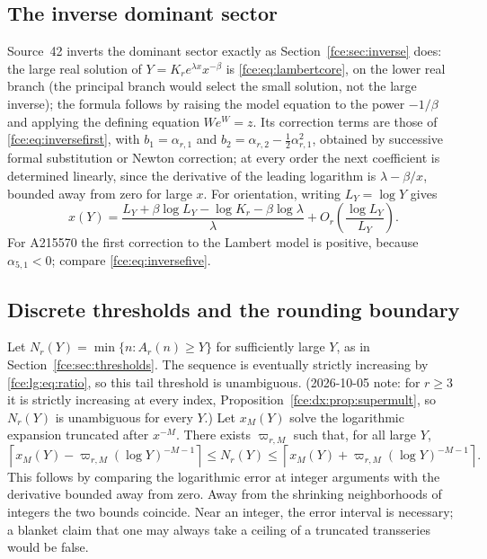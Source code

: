 \documentclass[11pt,a4paper]{article}
\numberwithin{equation}{section}
\theoremstyle{definition}\newtheorem{definition}[theorem]{Definition}
\theoremstyle{remark}\newtheorem{remark}[theorem]{Remark}
\begin{document}
\subsection{The inverse dominant sector}
Source~42 inverts the dominant sector exactly as
Section~\ref{fce:sec:inverse} does: the large real solution of
$Y=K_re^{\lambda x}x^{-\beta}$ is \eqref{fce:eq:lambertcore}, on the lower
real branch (the principal branch would select the small solution, not the
large inverse); the formula follows by raising the model equation to the
power $-1/\beta$ and applying the defining equation $We^W=z$. Its
correction terms are those of \eqref{fce:eq:inversefirst}, with
$b_1=\alpha_{r,1}$ and $b_2=\alpha_{r,2}-\frac12\alpha_{r,1}^2$, obtained
by successive formal substitution or Newton correction; at every order the
next coefficient is determined linearly, since the derivative of the
leading logarithm is $\lambda-\beta/x$, bounded away from zero for large
$x$. For orientation, writing $L_Y=\log Y$ gives
\begin{equation}\label{fce:lg:eq:loginverse}
 x(Y)=\frac{L_Y+\beta\log L_Y-\log K_r-\beta\log\lambda}{\lambda}
 +O_r\left(\frac{\log L_Y}{L_Y}\right).
\end{equation}
For A215570 the first correction to the Lambert model is positive, because
$\alpha_{5,1}<0$; compare \eqref{fce:eq:inversefive}.

\subsection{Discrete thresholds and the rounding boundary}
Let $N_r(Y)=\min\{n:A_r(n)\ge Y\}$ for sufficiently large $Y$, as in
Section~\ref{fce:sec:thresholds}. The sequence is eventually strictly
increasing by \eqref{fce:lg:eq:ratio}, so this tail threshold is
unambiguous. (2026-10-05 note: for $r\ge3$ it is strictly increasing at every
index, Proposition~\ref{fce:dx:prop:supermult}, so $N_r(Y)$ is unambiguous for
every $Y$.) Let $x_M(Y)$ solve the logarithmic expansion truncated after
$x^{-M}$. There exists $\varpi_{r,M}$ such that, for all large $Y$,
\begin{equation}\label{fce:lg:eq:rounding}
 \left\lceil x_M(Y)-\varpi_{r,M}(\log Y)^{-M-1}\right\rceil
 \le N_r(Y)\le
 \left\lceil x_M(Y)+\varpi_{r,M}(\log Y)^{-M-1}\right\rceil.
\end{equation}
This follows by comparing the logarithmic error at integer arguments with
the derivative bounded away from zero. Away from the shrinking
neighborhoods of integers the two bounds coincide. Near an integer, the
error interval is necessary; a blanket claim that one may always take a
ceiling of a truncated transseries would be false.
\end{document}
